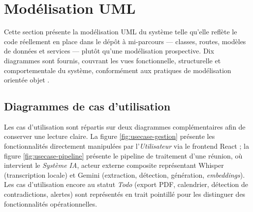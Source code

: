 \documentclass[12pt, a4paper]{article}
\begin{document}
\section{Modélisation UML}
\label{sec:uml}

Cette section présente la modélisation UML du système telle qu'elle reflète le code réellement en place dans le dépôt à mi-parcours — classes, routes, modèles de données et services — plutôt qu'une modélisation prospective. Dix diagrammes sont fournis, couvrant les vues fonctionnelle, structurelle et comportementale du système, conformément aux pratiques de modélisation orientée objet \parencite{fowler2018refactoring}.

\subsection{Diagrammes de cas d'utilisation}

Les cas d'utilisation sont répartis sur deux diagrammes complémentaires afin de conserver une lecture claire. La figure \ref{fig:usecase-gestion} présente les fonctionnalités directement manipulées par l'\textit{Utilisateur} via le frontend React ; la figure \ref{fig:usecase-pipeline} présente le pipeline de traitement d'une réunion, où intervient le \textit{Système IA}, acteur externe composite représentant Whisper (transcription locale) et Gemini (extraction, détection, génération, \textit{embeddings}). Les cas d'utilisation encore au statut \textit{Todo} (export PDF, calendrier, détection de contradictions, alertes) sont représentés en trait pointillé pour les distinguer des fonctionnalités opérationnelles.
\end{document}
